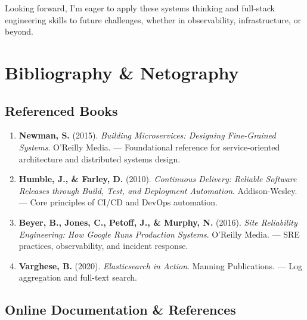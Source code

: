 \documentclass[12pt,a4paper]{report}
\begin{document}
Looking forward, I'm eager to apply these systems thinking and full-stack engineering skills to future challenges, whether in observability, infrastructure, or beyond.

\newpage

\chapter*{Bibliography \& Netography}

\section*{Referenced Books}

\begin{enumerate}
  \item \textbf{Newman, S.} (2015). \textit{Building Microservices: Designing Fine-Grained Systems}. O'Reilly Media. — Foundational reference for service-oriented architecture and distributed systems design.
  
  \item \textbf{Humble, J., \& Farley, D.} (2010). \textit{Continuous Delivery: Reliable Software Releases through Build, Test, and Deployment Automation}. Addison-Wesley. — Core principles of CI/CD and DevOps automation.
  
  \item \textbf{Beyer, B., Jones, C., Petoff, J., \& Murphy, N.} (2016). \textit{Site Reliability Engineering: How Google Runs Production Systems}. O'Reilly Media. — SRE practices, observability, and incident response.
  
  \item \textbf{Varghese, B.} (2020). \textit{Elasticsearch in Action}. Manning Publications. — Log aggregation and full-text search.
\end{enumerate}

\section*{Online Documentation \& References}
\end{document}
